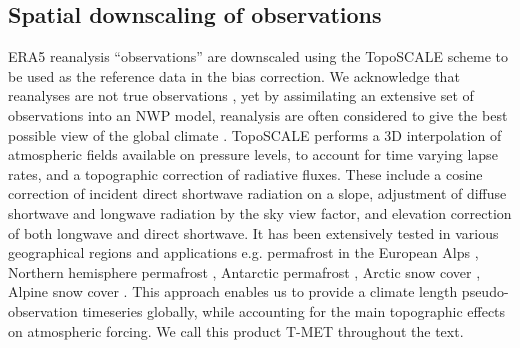 \documentclass[hess, manuscript]{copernicus}
\begin{document}
\subsection{Spatial downscaling of observations}
ERA5 reanalysis \citep{Hersbach2020-ze} “observations” are downscaled using the TopoSCALE scheme \citep{Fiddes2014-wt} to be used as the reference data in the bias correction. We acknowledge that reanalyses are not true observations \citep{Parker2016-qq}, yet by assimilating an extensive set of observations into an NWP model, reanalysis are often considered to give the best possible view of the global climate \cite{Dee2014-de}. TopoSCALE performs a 3D interpolation of atmospheric fields available on pressure levels, to account for time varying lapse rates, and a topographic correction of radiative fluxes. These include a cosine correction of incident direct shortwave radiation on a slope, adjustment of diffuse shortwave and longwave radiation by the sky view factor, and elevation correction of both longwave and direct shortwave. It has been extensively tested in various geographical regions and applications e.g. permafrost in the European Alps \citep{Fiddes2015-lx}, Northern hemisphere permafrost \citep{tc-9-1303-2015}, Antarctic permafrost \citep{Obu2020-ai}, Arctic snow cover \citep{Aalstad2018-vq}, Alpine snow cover \citep{Fiddes2019-vy}. This approach enables us to provide a climate length pseudo-observation timeseries globally, while accounting for the main topographic effects on atmospheric forcing. We call this product T-MET throughout the text.



\end{document}
